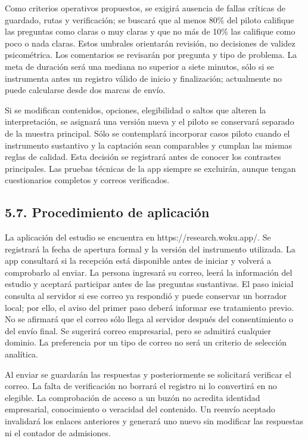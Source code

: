 \documentclass[12pt,letterpaper]{article}
\begin{document}
Como criterios operativos propuestos, se exigirá ausencia de fallas críticas de guardado, rutas y verificación; se buscará que al menos 80\% del piloto califique las preguntas como claras o muy claras y que no más de 10\% las califique como poco o nada claras. Estos umbrales orientarán revisión, no decisiones de validez psicométrica. Los comentarios se revisarán por pregunta y tipo de problema. La meta de duración será una mediana no superior a siete minutos, sólo si se instrumenta antes un registro válido de inicio y finalización; actualmente no puede calcularse desde dos marcas de envío.

Si se modifican contenidos, opciones, elegibilidad o saltos que alteren la interpretación, se asignará una versión nueva y el piloto se conservará separado de la muestra principal. Sólo se contemplará incorporar casos piloto cuando el instrumento sustantivo y la captación sean comparables y cumplan las mismas reglas de calidad. Esta decisión se registrará antes de conocer los contrastes principales. Las pruebas técnicas de la app siempre se excluirán, aunque tengan cuestionarios completos y correos verificados.

\subsection*{5.7. Procedimiento de aplicación}
La aplicación del estudio se encuentra en https://research.woku.app/. Se registrará la fecha de apertura formal y la versión del instrumento utilizada. La app consultará si la recepción está disponible antes de iniciar y volverá a comprobarlo al enviar. La persona ingresará su correo, leerá la información del estudio y aceptará participar antes de las preguntas sustantivas. El paso inicial consulta al servidor si ese correo ya respondió y puede conservar un borrador local; por ello, el aviso del primer paso deberá informar ese tratamiento previo. No se afirmará que el correo sólo llega al servidor después del consentimiento o del envío final. Se sugerirá correo empresarial, pero se admitirá cualquier dominio. La preferencia por un tipo de correo no será un criterio de selección analítica.

Al enviar se guardarán las respuestas y posteriormente se solicitará verificar el correo. La falta de verificación no borrará el registro ni lo convertirá en no elegible. La comprobación de acceso a un buzón no acredita identidad empresarial, conocimiento o veracidad del contenido. Un reenvío aceptado invalidará los enlaces anteriores y generará uno nuevo sin modificar las respuestas ni el contador de admisiones.
\end{document}
